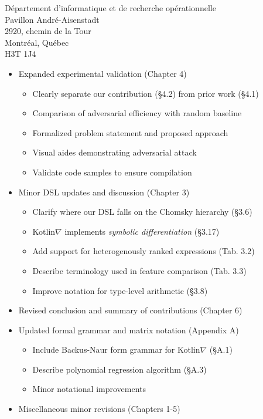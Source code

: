 \documentclass{letter}
\begin{document}
\begin{letter}{D\'epartement d'informatique et de recherche op\'erationnelle \\ Pavillon Andr\'e-Aisenstadt \\ 2920, chemin de la Tour \\ Montr\'eal, Qu\'ebec \\ H3T 1J4}
        \begin{itemize}
            \item Expanded experimental validation (Chapter 4)
                \begin{itemize}
                    \item Clearly separate our contribution (\S 4.2) from prior work (\S 4.1)
                    \item Comparison of adversarial efficiency with random baseline
                    \item Formalized problem statement and proposed approach
                    \item Visual aides demonstrating adversarial attack
                    \item Validate code samples to ensure compilation
                \end{itemize}
            \item Minor DSL updates and discussion (Chapter 3)
                \begin{itemize}
                    \item Clarify where our DSL falls on the Chomsky hierarchy (\S 3.6)
                    \item Kotlin$\nabla$ implements \textit{symbolic differentiation} (\S 3.17)
                    \item Add support for heterogenously ranked expressions (Tab. 3.2)
                    \item Describe terminology used in feature comparison (Tab. 3.3)
                    \item Improve notation for type-level arithmetic (\S 3.8)
                \end{itemize}
            \item Revised conclusion and summary of contributions (Chapter 6)
            \item Updated formal grammar and matrix notation (Appendix A)
                \begin{itemize}
                    \item Include Backus-Naur form grammar for Kotlin$\nabla$ (\S A.1)
                    \item Describe polynomial regression algorithm (\S A.3)
                    \item Minor notational improvements
                \end{itemize}
            \item Miscellaneous minor revisions (Chapters 1-5)

\end{itemize}
\end{letter}
\end{document}
